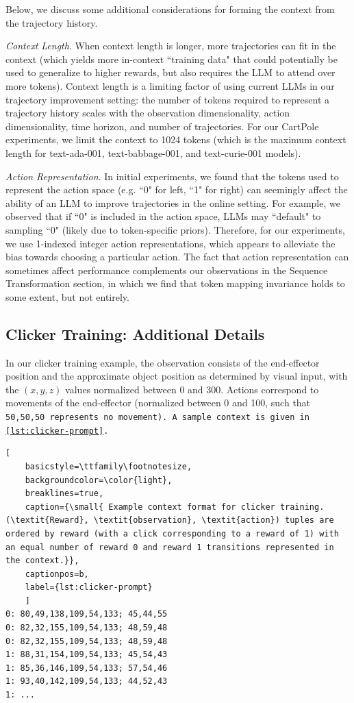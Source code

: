 Below, we discuss some additional considerations for forming the context from the trajectory history.

\textit{Context Length}. When context length is longer, more trajectories can fit in the context (which yields more in-context ``training data" that could potentially be used to generalize to higher rewards, but also requires the LLM to attend over more tokens). Context length is a limiting factor of using current LLMs in our trajectory improvement setting: the number of tokens required to represent a trajectory history scales with the observation dimensionality, action dimensionality, time horizon, and number of trajectories. For our CartPole experiments, we limit the context to 1024 tokens (which is the maximum context length for text-ada-001, text-babbage-001, and text-curie-001 models). 

\textit{Action Representation}. In initial experiments, we found that the tokens used to represent the action space (e.g. ``0" for left, ``1" for right) can seemingly affect the ability of an LLM to improve trajectories in the online setting. For example, we observed that if ``0" is included in the action space, LLMs may ``default" to sampling ``0" (likely due to token-specific priors). Therefore, for our experiments, we use 1-indexed integer action representations, which appears to alleviate the bias towards choosing a particular action. The fact that action representation can sometimes affect performance complements our observations in the Sequence Transformation section, in which we find that token mapping invariance holds to some extent, but not entirely.

\subsection{Clicker Training: Additional Details}

In our clicker training example, the observation consists of the end-effector position and the approximate object position as determined by visual input, with the $(x,y,z)$ values normalized between 0 and 300. Actions correspond to movements of the end-effector (normalized between 0 and 100, such that \tt{50,50,50} represents no movement). A sample context is given in \cref{lst:clicker-prompt}.

\begin{lstlisting}[
    basicstyle=\ttfamily\footnotesize,
    backgroundcolor=\color{light},
    breaklines=true,
    caption={\small{ Example context format for clicker training. (\textit{Reward}, \textit{observation}, \textit{action}) tuples are ordered by reward (with a click corresponding to a reward of 1) with an equal number of reward 0 and reward 1 transitions represented in the context.}}, 
    captionpos=b,
    label={lst:clicker-prompt}
    ]
0: 80,49,138,109,54,133; 45,44,55
0: 82,32,155,109,54,133; 48,59,48
0: 82,32,155,109,54,133; 48,59,48
1: 88,31,154,109,54,133; 45,54,43
1: 85,36,146,109,54,133; 57,54,46
1: 93,40,142,109,54,133; 44,52,43
1: ...
\end{lstlisting}
